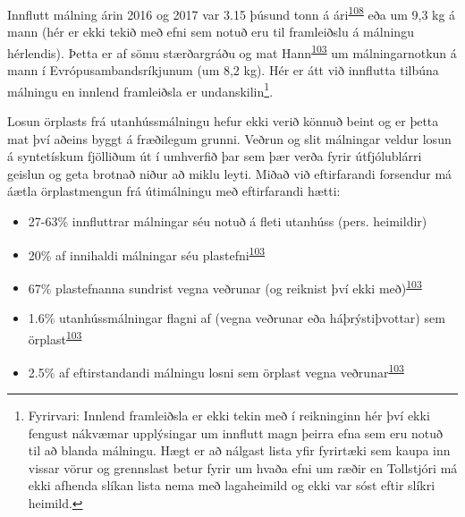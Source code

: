 \documentclass[icelandic,]{book}
\providecommand{\tightlist}{%
  \setlength{\itemsep}{0pt}\setlength{\parskip}{0pt}}
\let\rmarkdownfootnote\footnote%
\def\footnote{\protect\rmarkdownfootnote}
\begin{document}
Innflutt málning árin 2016 og 2017 var 3.15 þúsund tonn á ári\textsuperscript{\protect\hyperlink{ref-tollur2017}{108}} eða um 9,3 kg á mann (hér er ekki tekið með efni sem notuð eru til framleiðslu á málningu hérlendis). Þetta er af sömu stærðargráðu og mat Hann\textsuperscript{\protect\hyperlink{ref-Hann2018}{103}} um málningarnotkun á mann í Evrópusambandsríkjunum (um 8,2 kg). Hér er átt við innflutta tilbúna málningu en innlend framleiðsla er undanskilin\footnote{Fyrirvari: Innlend framleiðsla er ekki tekin með í reikninginn hér því ekki fengust nákvæmar upplýsingar um innflutt magn þeirra efna sem eru notuð til að blanda málningu. Hægt er að nálgast lista yfir fyrirtæki sem kaupa inn vissar vörur og grennslast betur fyrir um hvaða efni um ræðir en Tollstjóri má ekki afhenda slíkan lista nema með lagaheimild og ekki var sóst eftir slíkri heimild.}.

Losun örplasts frá utanhússmálningu hefur ekki verið könnuð beint og er þetta mat því aðeins byggt á fræðilegum grunni. Veðrun og slit málningar veldur losun á syntetískum fjölliðum út í umhverfið þar sem þær verða fyrir útfjólublárri geislun og geta brotnað niður að miklu leyti. Miðað við eftirfarandi forsendur má áætla örplastmengun frá útimálningu með eftirfarandi hætti:

\begin{itemize}
\tightlist
\item
  27-63\% innfluttrar málningar séu notuð á fleti utanhúss (pers. heimildir)
\item
  20\% af innihaldi málningar séu plastefni\textsuperscript{\protect\hyperlink{ref-Hann2018}{103}}
\item
  67\% plastefnanna sundrist vegna veðrunar (og reiknist því ekki með)\textsuperscript{\protect\hyperlink{ref-Hann2018}{103}}
\item
  1.6\% utanhússmálningar flagni af (vegna veðrunar eða háþrýstiþvottar) sem örplast\textsuperscript{\protect\hyperlink{ref-Hann2018}{103}}
\item
  2.5\% af eftirstandandi málningu losni sem örplast vegna veðrunar\textsuperscript{\protect\hyperlink{ref-Hann2018}{103}}
\end{itemize}
\end{document}
